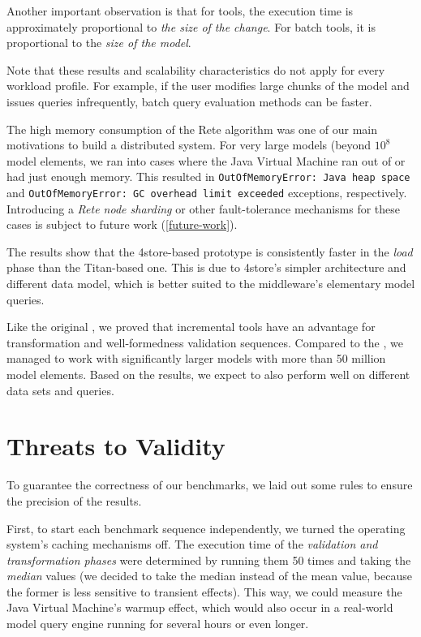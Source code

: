 Another important observation is that for \iqd{} tools, the execution time is approximately proportional to \emph{the size of the change}. For batch tools, it is proportional to the \emph{size of the model}. 

Note that these results and scalability characteristics do not apply for every workload profile. For example, if the user modifies large chunks of the model and issues queries infrequently, batch query evaluation methods can be faster. 

The high memory consumption of the Rete algorithm was one of our main motivations to build a distributed system. For very large models (beyond $10^8$ model elements, we ran into cases where the Java Virtual Machine ran out of or had just enough memory. This resulted in \texttt{OutOfMemoryError: Java heap space} and \texttt{OutOfMemoryError: GC overhead limit exceeded} exceptions, respectively. Introducing a \emph{Rete node sharding} or other fault-tolerance mechanisms for these cases is subject to future work (\autoref{future-work}).

The results show that the 4store-based \iqd{} prototype is consistently faster in the \emph{load} phase than the Titan-based one. This is due to 4store's simpler architecture and different data model, which is better suited to the \iqd{} middleware's elementary model queries.

Like the original \tb{}, we proved that incremental tools have an advantage for transformation and well-formedness validation sequences. Compared to the \tb{}, we managed to work with significantly larger models with more than 50 million model elements. Based on the results, we expect \iqd{} to also perform well on different data sets and queries.  

\section{Threats to Validity}
\label{threats-to-validity}

To guarantee the correctness of our benchmarks, we laid out some rules to ensure the precision of the results.

First, to start each benchmark sequence independently, we turned the operating system's caching mechanisms off. The execution time of the \emph{validation and transformation phases} were determined by running them 50 times and taking the \emph{median} values (we decided to take the median instead of the mean value, because the former is less sensitive to transient effects). This way, we could measure the Java Virtual Machine's warmup effect, which would also occur in a real-world model query engine running for several hours or even longer.

